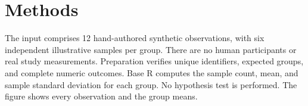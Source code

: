 \section{Methods}
The input comprises 12 hand-authored synthetic observations, with six independent
illustrative samples per group. There are no human participants or real study
measurements. Preparation verifies unique identifiers, expected groups, and
complete numeric outcomes. Base R computes the sample count, mean, and sample
standard deviation for each group. No hypothesis test is performed. The figure
shows every observation and the group means.
